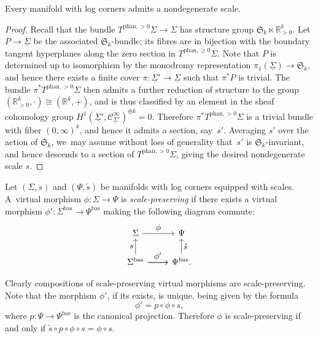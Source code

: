 \documentclass[10pt]{amsart}
\let\tst\textstyle
\theoremstyle{definition}
\theoremstyle{remark}
\let\defn\emph
\newcommand{\RR}{\mathbb{R}}
\renewcommand{\ge}{\geqslant}
\newcommand{\Cinf}[1]{\mathscr{C}^{\infty}_{#1}}
\newcommand{\Sig}{\Sigma}
\newcommand{\uSig}{\underline{\Sigma}}
\newcommand{\bas}[1]{{#1}^{\mathrm{bas}}}
\newcommand{\phant}{\mathrm{phan}}
\newcommand{\Sigbas}{\bas{\Sig}}
\newcommand{\Psibas}{\bas{\Psi}}
\newcommand{\tbposphan}[2][]{T^{\phant,>0}_{#1}#2}
\newcommand{\tbgephan}[2][]{T^{\phant,\ge0}_{#1}#2}
\newcommand{\symgp}[1]{\mathfrak{S}_{#1}}
\begin{document}
\begin{proposition}\label{prop:scales-exist}
Every manifold with log corners admits a nondegenerate scale.
\end{proposition}

\begin{proof}
Recall that the bundle $\tbposphan{\Sig} \to \Sig$ has structure group $\symgp{k}\ltimes \RR_{>0}^k$.
Let $P \to \uSig$ be the associated $\symgp{k}$-bundle; its fibres are in bijection with the boundary tangent hyperplanes along the zero section in $\tbgephan{\Sig}$. Note that $P$ is determined up to isomorphism by the monodromy representation $\pi_1(\uSig) \to \symgp{k}$, and hence there exists a finite cover $\pi \colon \uSig' \to \uSig$ such that $\pi^*P$ is trivial. The bundle $\pi^*\tbposphan{\Sig}$ then admits a further reduction of structure to the group $(\RR_{>0}^k,\cdot)\cong (\RR^k,+)$, and is thus classified by an element in the sheaf cohomology group $H^1(\uSig',\Cinf{\uSig'})^{\oplus k} = 0$. Therefore $\pi^*\tbposphan{\Sig}$ is a trivial bundle with fiber $(0,\infty)^k$, and hence it admits a section, say~$s'$. Averaging $s'$ over the action of $\symgp{k}$, we~may assume without loss of generality that~$s'$ is $\symgp{k}$-invariant, and hence descends to a section of $\tbposphan{\Sig}$, giving the desired nondegenerate scale $s$.
\end{proof}

\begin{definition}\label{def:scale-preserving}
Let $(\Sig,s)$ and $(\Psi,\tilde s)$ be manifolds with log corners equipped with scales. A~virtual morphism $\phi \colon \Sig \to \Psi$ is \defn{scale-preserving} if there exists a virtual morphism $\phi' \colon \Sigbas \to \Psibas$ making the following diagram commute:
\begin{equation}\label{eq:scale-preserving}
\begin{tikzcd}
\Sig \ar[r,"\tst \phi"] & \Psi \\
\Sigbas \ar[r,"\tst \phi'"]\ar[u,"\tst  s"] \ar[r] & \Psibas\ar[u,"\tst \tilde s"'].
\end{tikzcd}
\end{equation}
\end{definition}
Clearly compositions of scale-preserving virtual morphisms are scale-preserving. Note that the morphism $\phi'$, if its exists, is unique, being given by the formula
\begin{equation}\label{eq:scale-preserving-concrete}
\phi' = p \circ \phi \circ s,
\end{equation}
where $p \colon \Psi \to \Psibas$ is the canonical projection. Therefore $\phi$ is scale-preserving if and only if $\tilde{s}\circ p\circ\phi\circ s=\phi\circ s$.
\end{document}
